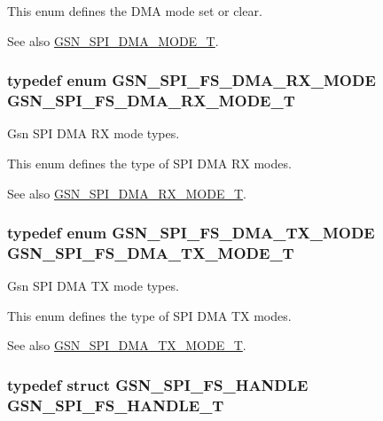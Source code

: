 This enum defines the DMA mode set or clear. \begin{DoxySeeAlso}{See also}
\hyperlink{a00655_gafff743b26bbfafb380a9797457935a0e}{GSN\_\-SPI\_\-DMA\_\-MODE\_\-T}. 
\end{DoxySeeAlso}
\hypertarget{a00655_ga9bb270ede7d3ddae0e748f7927ad00bd}{
\subsubsection[{GSN\_\-SPI\_\-FS\_\-DMA\_\-RX\_\-MODE\_\-T}]{\setlength{\rightskip}{0pt plus 5cm}typedef enum {\bf GSN\_\-SPI\_\-FS\_\-DMA\_\-RX\_\-MODE}  {\bf GSN\_\-SPI\_\-FS\_\-DMA\_\-RX\_\-MODE\_\-T}}}
\label{a00655_ga9bb270ede7d3ddae0e748f7927ad00bd}


Gsn SPI DMA RX mode types. 

This enum defines the type of SPI DMA RX modes. \begin{DoxySeeAlso}{See also}
\hyperlink{a00655_ga884b22be3cf70e4b96a0cda9b704390a}{GSN\_\-SPI\_\-DMA\_\-RX\_\-MODE\_\-T}. 
\end{DoxySeeAlso}
\hypertarget{a00655_ga6203f693749188e8f14ff1675d2eb40f}{
\subsubsection[{GSN\_\-SPI\_\-FS\_\-DMA\_\-TX\_\-MODE\_\-T}]{\setlength{\rightskip}{0pt plus 5cm}typedef enum {\bf GSN\_\-SPI\_\-FS\_\-DMA\_\-TX\_\-MODE}  {\bf GSN\_\-SPI\_\-FS\_\-DMA\_\-TX\_\-MODE\_\-T}}}
\label{a00655_ga6203f693749188e8f14ff1675d2eb40f}


Gsn SPI DMA TX mode types. 

This enum defines the type of SPI DMA TX modes. \begin{DoxySeeAlso}{See also}
\hyperlink{a00655_ga39efef290b5dfeaaa7892823d6bfd724}{GSN\_\-SPI\_\-DMA\_\-TX\_\-MODE\_\-T}. 
\end{DoxySeeAlso}
\hypertarget{a00655_ga306453bdfa5ffae1498080168f2ee555}{
\subsubsection[{GSN\_\-SPI\_\-FS\_\-HANDLE\_\-T}]{\setlength{\rightskip}{0pt plus 5cm}typedef struct {\bf GSN\_\-SPI\_\-FS\_\-HANDLE} {\bf GSN\_\-SPI\_\-FS\_\-HANDLE\_\-T}}}
\label{a00655_ga306453bdfa5ffae1498080168f2ee555}


